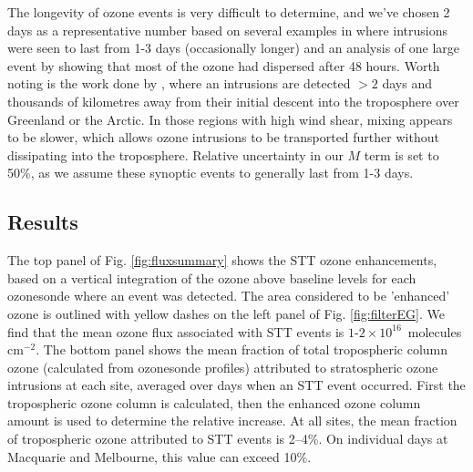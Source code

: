 \documentclass[acp, manuscript]{copernicus} %
\begin{document}
    The longevity of ozone events is very difficult to determine, and we've chosen 2 days as a representative number based on several examples in \cite{Lin2012} where intrusions were seen to last from 1-3 days (occasionally longer) and an analysis of one large event by \cite{Cooper2004} showing that most of the ozone had dispersed after 48 hours.
    Worth noting is the work done by \cite{Trickl2014}, where an intrusions are detected $>2$ days and thousands of kilometres away from their initial descent into the troposphere over Greenland or the Arctic.
    In those regions with high wind shear, mixing appears to be slower, which allows ozone intrusions to be transported further without dissipating into the troposphere.
    Relative uncertainty in our $M$ term is set to 50\%, as we assume these synoptic events to generally last from 1-3 days.
    
  \subsection{Results}
  
    The top panel of Fig. \ref{fig:fluxsummary} shows the STT ozone enhancements, based on a vertical integration of the ozone above baseline levels for each ozonesonde where an event was detected.
    The area considered to be 'enhanced' ozone is outlined with yellow dashes on the left panel of Fig. \ref{fig:filterEG}.
    We find that the mean ozone flux associated with STT events is $1$-$2 \times 10^{16}$~molecules cm$^{-2}$.
    The bottom panel shows the mean fraction of total tropospheric column ozone (calculated from ozonesonde profiles) attributed to stratospheric ozone intrusions at each site, averaged over days when an STT event occurred.
    First the tropospheric ozone column is calculated, then the enhanced ozone column amount is used to determine the relative increase.
    At all sites, the mean fraction of tropospheric ozone attributed to STT events is 2--4\%. On individual days at Macquarie and Melbourne, this value can exceed 10\%.
    
\end{document}
